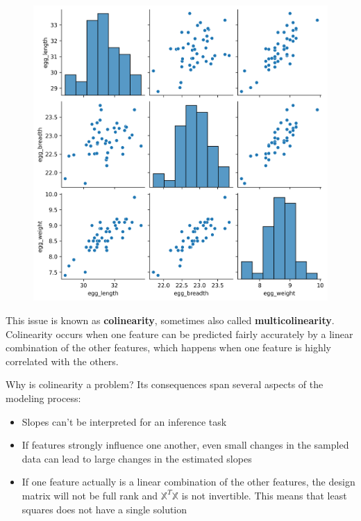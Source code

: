\documentclass[
  letterpaper,
  DIV=11,
  numbers=noendperiod]{scrreprt}
\providecommand{\tightlist}{%
  \setlength{\itemsep}{0pt}\setlength{\parskip}{0pt}}\usepackage{longtable,booktabs,array}
\begin{document}
\begin{figure}[H]

{\centering \includegraphics{inference_causality/inference_causality_files/figure-pdf/cell-8-output-1.png}

}

\end{figure}

This issue is known as \textbf{colinearity}, sometimes also called
\textbf{multicolinearity}. Colinearity occurs when one feature can be
predicted fairly accurately by a linear combination of the other
features, which happens when one feature is highly correlated with the
others.

Why is colinearity a problem? Its consequences span several aspects of
the modeling process:

\begin{itemize}
\tightlist
\item
  Slopes can't be interpreted for an inference task
\item
  If features strongly influence one another, even small changes in the
  sampled data can lead to large changes in the estimated slopes
\item
  If one feature actually is a linear combination of the other features,
  the design matrix will not be full rank and \(\mathbb{X}^T\mathbb{X}\)
  is not invertible. This means that least squares does not have a
  single solution
\end{itemize}
\end{document}
